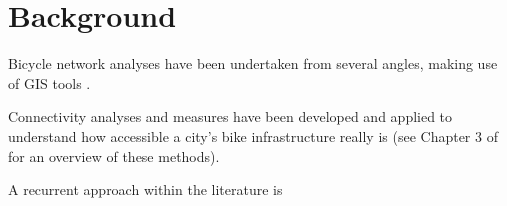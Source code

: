 \documentclass[information,article,submit,moreauthors,Latex,dvi2pdf,10pt,a4paper]{Definitions/mdpi}
\begin{document}
\section{Background} \label{background}

Bicycle network analyses have been undertaken from several angles, making use of GIS tools \cite{Manum2013,Cooper2017}.

\begin{mycolorbox}[colback=yellow]
Connectivity analyses and measures have been developed and applied to understand how accessible a city's bike infrastructure really is (see Chapter 3 of \cite{Twadell2018} for an overview of these methods).
\end{mycolorbox}

A recurrent approach within the literature is
\end{document}
